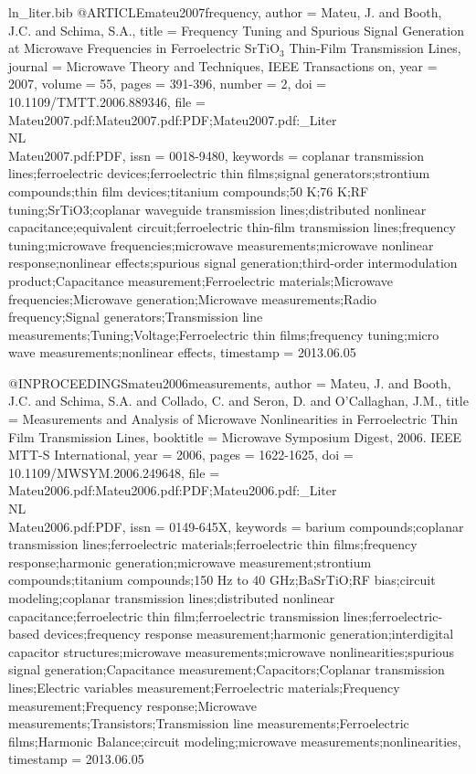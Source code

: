 \begin{filecontents*}{ln_liter.bib}
@ARTICLE{mateu2007frequency,
  author = {Mateu, J. and Booth, J.C. and Schima, S.A.},
  title = {Frequency Tuning and Spurious Signal Generation at Microwave Frequencies
	in Ferroelectric {SrTiO}$_3$ Thin-Film Transmission Lines},
  journal = {Microwave Theory and Techniques, IEEE Transactions on},
  year = {2007},
  volume = {55},
  pages = {391-396},
  number = {2},
  doi = {10.1109/TMTT.2006.889346},
  file = {Mateu2007.pdf:Mateu2007.pdf:PDF;Mateu2007.pdf:_Liter\\NL\\Mateu2007.pdf:PDF},
  issn = {0018-9480},
  keywords = {coplanar transmission lines;ferroelectric devices;ferroelectric thin
	films;signal generators;strontium compounds;thin film devices;titanium
	compounds;50 K;76 K;RF tuning;SrTiO3;coplanar waveguide transmission
	lines;distributed nonlinear capacitance;equivalent circuit;ferroelectric
	thin-film transmission lines;frequency tuning;microwave frequencies;microwave
	measurements;microwave nonlinear response;nonlinear effects;spurious
	signal generation;third-order intermodulation product;Capacitance
	measurement;Ferroelectric materials;Microwave frequencies;Microwave
	generation;Microwave measurements;Radio frequency;Signal generators;Transmission
	line measurements;Tuning;Voltage;Ferroelectric thin films;frequency
	tuning;micro wave measurements;nonlinear effects},
  timestamp = {2013.06.05}
}

@INPROCEEDINGS{mateu2006measurements,
  author = {Mateu, J. and Booth, J.C. and Schima, S.A. and Collado, C. and Seron,
	D. and O'Callaghan, J.M.},
  title = {Measurements and Analysis of Microwave Nonlinearities in Ferroelectric
	Thin Film Transmission Lines},
  booktitle = {Microwave Symposium Digest, 2006. IEEE MTT-S International},
  year = {2006},
  pages = {1622-1625},
  doi = {10.1109/MWSYM.2006.249648},
  file = {Mateu2006.pdf:Mateu2006.pdf:PDF;Mateu2006.pdf:_Liter\\NL\\Mateu2006.pdf:PDF},
  issn = {0149-645X},
  keywords = {barium compounds;coplanar transmission lines;ferroelectric materials;ferroelectric
	thin films;frequency response;harmonic generation;microwave measurement;strontium
	compounds;titanium compounds;150 Hz to 40 GHz;BaSrTiO;RF bias;circuit
	modeling;coplanar transmission lines;distributed nonlinear capacitance;ferroelectric
	thin film;ferroelectric transmission lines;ferroelectric-based devices;frequency
	response measurement;harmonic generation;interdigital capacitor structures;microwave
	measurements;microwave nonlinearities;spurious signal generation;Capacitance
	measurement;Capacitors;Coplanar transmission lines;Electric variables
	measurement;Ferroelectric materials;Frequency measurement;Frequency
	response;Microwave measurements;Transistors;Transmission line measurements;Ferroelectric
	films;Harmonic Balance;circuit modeling;microwave measurements;nonlinearities},
  timestamp = {2013.06.05}
}


\end{filecontents*}
